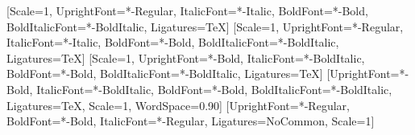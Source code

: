 \newfontfamily{}[Scale=1, UprightFont=*-Regular, ItalicFont=*-Italic, BoldFont=*-Bold, BoldItalicFont=*-BoldItalic, Ligatures=TeX]
\newfontfamily{}[Scale=1, UprightFont=*-Regular, ItalicFont=*-Italic, BoldFont=*-Bold, BoldItalicFont=*-BoldItalic, Ligatures=TeX]
\newfontfamily{}[Scale=1, UprightFont=*-Bold, ItalicFont=*-BoldItalic, BoldFont=*-Bold, BoldItalicFont=*-BoldItalic, Ligatures=TeX]
\newfontfamily{}[UprightFont=*-Bold, ItalicFont=*-BoldItalic,
  BoldFont=*-Bold, BoldItalicFont=*-BoldItalic, Ligatures=TeX, Scale=1,
  WordSpace=0.90]
\newfontfamily{}[UprightFont=*-Regular, BoldFont=*-Bold, ItalicFont=*-Regular, Ligatures=NoCommon, Scale=1]

\newcommand{\nlrlining}{}

%
\usepackage{xcolor}

\AtBeginDocument{\renewcommand{\normalcolor}{\color{nlrink}}\normalcolor}

\newcommand{\nlrbody}{\fontsize{11}{16}\selectfont}
\newcommand{\nlrcodesize}{\fontsize{9}{12.5}\selectfont}
\newcommand{\nlroutsize}{\fontsize{8.5}{12}\selectfont}
\newcommand{\nlrmarginsize}{\fontsize{8.5}{12}\selectfont}
\newcommand{\nlrcapsize}{\fontsize{9.5}{13}\selectfont}
\newcommand{\nlrtablesize}{\fontsize{9.5}{13}\selectfont}
\newcommand{\nlrcalloutsize}{\fontsize{10}{14.5}\selectfont}
\newcommand{\nlrlabelsize}{\fontsize{8.5}{10}\selectfont}
\renewcommand{\normalsize}{\nlrbody}
\normalsize


